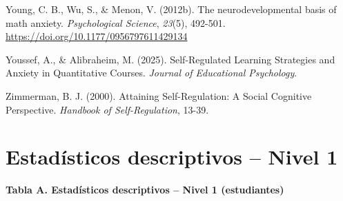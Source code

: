 \documentclass[
  spanish,
  a4paper,
  oneside]{scrbook}
\newlength{\cslhangindent}
\newenvironment{CSLReferences}[2] %
 {\begin{list}{}{%
  \setlength{\itemindent}{0pt}
  \setlength{\leftmargin}{0pt}
  \setlength{\parsep}{0pt}
  \ifodd #1
   \setlength{\leftmargin}{\cslhangindent}
   \setlength{\itemindent}{-1\cslhangindent}
  \fi
  \setlength{\itemsep}{#2\baselineskip}}}
 {\end{list}}
\begin{document}
\begin{CSLReferences}{1}{0}
Young, C. B., Wu, S., \& Menon, V. (2012b). The neurodevelopmental basis
of math anxiety. \emph{Psychological Science}, \emph{23}(5), 492-501.
\url{https://doi.org/10.1177/0956797611429134}

Youssef, A., \& Alibraheim, M. (2025). Self-Regulated Learning
Strategies and Anxiety in Quantitative Courses. \emph{Journal of
Educational Psychology}.

Zimmerman, B. J. (2000). Attaining Self-Regulation: A Social Cognitive
Perspective. \emph{Handbook of Self-Regulation}, 13-39.

\end{CSLReferences}

\cleardoublepage
{}
{}
\appendix

\chapter{Estadísticos descriptivos -- Nivel 1}\label{sec-anexo-a}

\begingroup
\footnotesize

\textbf{Tabla A. Estadísticos descriptivos -- Nivel 1 (estudiantes)}
\end{document}
